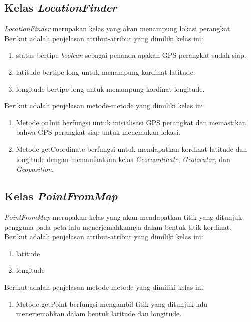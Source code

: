 \subsection{Kelas \textit{LocationFinder}}
\label{lab:Kelas LocationFinder}
\hspace{0.5cm} \textit{LocationFinder} merupakan kelas yang akan menampung lokasi perangkat. Berikut adalah penjelasan atribut-atribut yang dimiliki kelas ini:
\begin{enumerate}
	\item status bertipe \textit{boolean} sebagai penanda apakah GPS perangkat sudah siap.
	\item latitude bertipe long untuk menampung kordinat latitude.
	\item longitude bertipe long untuk menampung kordinat longitude.
\end{enumerate}

Berikut adalah penjelasan metode-metode yang dimiliki kelas ini:
\begin{enumerate}
	\item Metode onInit berfungsi untuk inisialisasi GPS perangkat dan memastikan bahwa GPS perangkat siap untuk menemukan lokasi.
	\item Metode getCoordinate berfungsi untuk mendapatkan kordinat latitude dan longitude dengan memanfaatkan kelas \textit{Geocoordinate}, \textit{Geolocator}, dan \textit{Geoposition}.   
\end{enumerate}

\subsection{Kelas \textit{PointFromMap}}
\label{lab:Kelas PointFromMap}
\hspace{0.5cm} \textit{PointFromMap} merupakan kelas yang akan mendapatkan titik yang ditunjuk pengguna pada peta lalu menerjemahkannya dalam bentuk titik kordinat. Berikut adalah penjelasan atribut-atribut yang dimiliki kelas ini:
\begin{enumerate}
	\item latitude
	\item longitude
\end{enumerate}

Berikut adalah penjelasan metode-metode yang dimiliki kelas ini:
\begin{enumerate}
	\item Metode getPoint berfungsi mengambil titik yang ditunjuk lalu menerjemahkan dalam bentuk latitude dan longitude. 
\end{enumerate}

